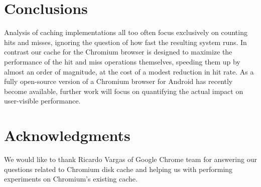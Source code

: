 \documentclass[letterpaper,twocolumn,10pt]{article}
\begin{document}
\section{Conclusions}

Analysis of caching implementations all too often focus exclusively on
counting hits and misses, ignoring the question of how fast the
resulting system runs. In contrast our cache for the Chromium browser
is designed to maximize the performance of the hit and miss operations
themselves, speeding them up by almost an order of magnitude, at the
cost of a modest reduction in hit rate. As a fully open-source version of a
Chromium browser for Android has recently become available, further work will
focus on quantifying the actual impact on user-visible performance.

\section*{Acknowledgments}

We would like to thank Ricardo Vargas of Google Chrome team for answering our
questions related to Chromium disk cache and helping us with performing
experiments on Chromium's existing cache.


\end{document}
